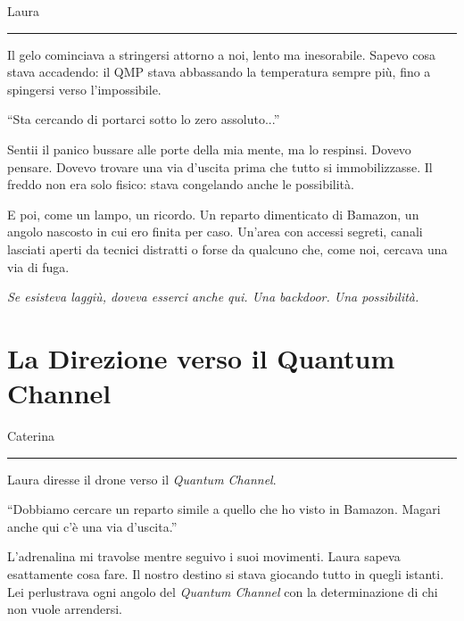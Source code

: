 \vspace{1em} \begin{center}Laura\end{center} \hrule \vspace{1em}

Il gelo cominciava a stringersi attorno a noi, lento ma inesorabile. Sapevo cosa stava accadendo: il QMP stava abbassando la temperatura sempre più, fino a spingersi verso l'impossibile.

\begin{dialogue}  \enquote{Sta cercando di portarci sotto lo zero assoluto...} \end{dialogue}

Sentii il panico bussare alle porte della mia mente, ma lo respinsi. Dovevo pensare. Dovevo trovare una via d’uscita prima che tutto si immobilizzasse. Il freddo non era solo fisico: stava congelando anche le possibilità.

E poi, come un lampo, un ricordo. Un reparto dimenticato di Bamazon, un angolo nascosto in cui ero finita per caso. Un’area con accessi segreti, canali lasciati aperti da tecnici distratti o forse da qualcuno che, come noi, cercava una via di fuga.

\textit{Se esisteva laggiù, doveva esserci anche qui. Una backdoor. Una possibilità.}

\section{La Direzione verso il Quantum Channel}

\vspace{1em} \begin{center}Caterina\end{center} \hrule \vspace{1em}

Laura diresse il drone verso il \textit{Quantum Channel}.

\begin{dialogue}
 \enquote{Dobbiamo cercare un reparto simile a quello che ho visto in Bamazon. Magari anche qui c'è una via d'uscita.}
\end{dialogue}

L'adrenalina mi travolse mentre seguivo i suoi movimenti. Laura sapeva esattamente cosa fare. Il nostro destino si stava giocando tutto in quegli istanti. Lei perlustrava ogni angolo del \textit{Quantum Channel} con la determinazione di chi non vuole arrendersi.

